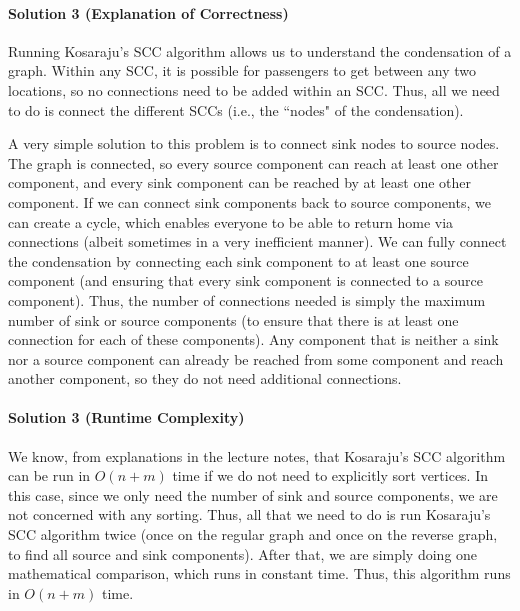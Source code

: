 \documentclass[11pt]{article}
\begin{document}
\paragraph{Solution 3 (Explanation of Correctness)}

Running Kosaraju's SCC algorithm allows us to understand the condensation of a graph. Within any SCC, it is possible for passengers to get between any two locations, so no connections need to be added within an SCC. Thus, all we need to do is connect the different SCCs (i.e., the ``nodes" of the condensation).
\vspace{0.5em}

A very simple solution to this problem is to connect sink nodes to source nodes. The graph is connected, so every source component can reach at least one other component, and every sink component can be reached by at least one other component. If we can connect sink components back to source components, we can create a cycle, which enables everyone to be able to return home via connections (albeit sometimes in a very inefficient manner). We can fully connect the condensation by connecting each sink component to at least one source component (and ensuring that every sink component is connected to a source component). Thus, the number of connections needed is simply the maximum number of sink or source components (to ensure that there is at least one connection for each of these components). Any component that is neither a sink nor a source component can already be reached from some component and reach another component, so they do not need additional connections. 

\paragraph{Solution 3 (Runtime Complexity)}

We know, from explanations in the lecture notes, that Kosaraju's SCC algorithm can be run in $O(n + m)$ time if we do not need to explicitly sort vertices. In this case, since we only need the number of sink and source components, we are not concerned with any sorting. Thus, all that we need to do is run Kosaraju's SCC algorithm twice (once on the regular graph and once on the reverse graph, to find all source and sink components). After that, we are simply doing one mathematical comparison, which runs in constant time. Thus, this algorithm runs in $O(n + m)$ time.

\end{document}
